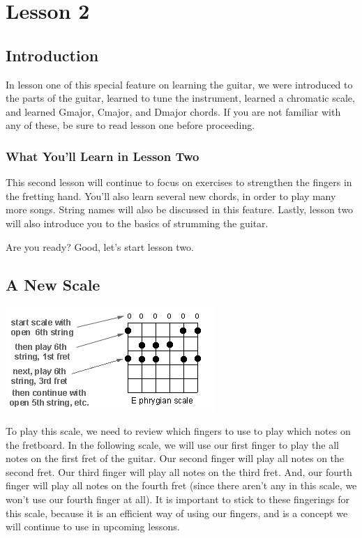 \chapter{Lesson 2}
\section{Introduction}
In lesson one of this special feature on learning the guitar, we were
introduced to the parts of the guitar, learned to tune the instrument, learned
a chromatic scale, and learned Gmajor, Cmajor, and Dmajor chords. If you are
not familiar with any of these, be sure to read lesson one before proceeding.

\subsection{What You'll Learn in Lesson Two}

This second lesson will continue to focus on exercises to strengthen the
fingers in the fretting hand. You'll also learn several new chords, in order to
play many more songs. String names will also be discussed in this feature.
Lastly, lesson two will also introduce you to the basics of strumming the
guitar.

Are you ready? Good, let's start lesson two.

\section{A New Scale}
\includegraphics{parttwo/ephrygianscale.png}

To play this scale, we need to review which fingers to use to play which notes
on the fretboard. In the following scale, we will use our first finger to play
the all notes on the first fret of the guitar. Our second finger will play all
notes on the second fret. Our third finger will play all notes on the third
fret. And, our fourth finger will play all notes on the fourth fret (since
there aren't any in this scale, we won't use our fourth finger at all). It is
important to stick to these fingerings for this scale, because it is an
efficient way of using our fingers, and is a concept we will continue to use in
upcoming lessons.

